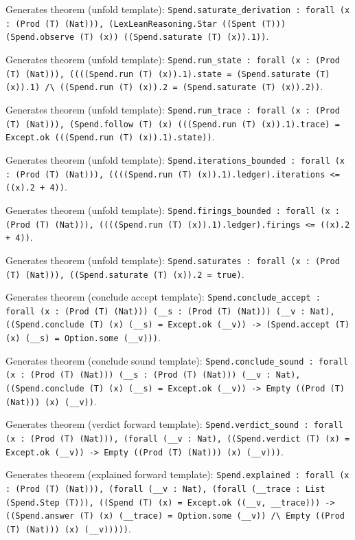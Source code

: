 \documentclass[11pt]{article}
\begin{document}
\noindent Generates theorem (unfold template): \texttt{Spend.saturate\_derivation : forall (x : (Prod (T) (Nat))), (LexLeanReasoning.Star ((Spent (T))) (Spend.observe (T) (x)) ((Spend.saturate (T) (x)).1))}.\par
\noindent Generates theorem (unfold template): \texttt{Spend.run\_state : forall (x : (Prod (T) (Nat))), ((((Spend.run (T) (x)).1).state = (Spend.saturate (T) (x)).1) /\textbackslash{} ((Spend.run (T) (x)).2 = (Spend.saturate (T) (x)).2))}.\par
\noindent Generates theorem (unfold template): \texttt{Spend.run\_trace : forall (x : (Prod (T) (Nat))), (Spend.follow (T) (x) (((Spend.run (T) (x)).1).trace) = Except.ok (((Spend.run (T) (x)).1).state))}.\par
\noindent Generates theorem (unfold template): \texttt{Spend.iterations\_bounded : forall (x : (Prod (T) (Nat))), ((((Spend.run (T) (x)).1).ledger).iterations <= ((x).2 + 4))}.\par
\noindent Generates theorem (unfold template): \texttt{Spend.firings\_bounded : forall (x : (Prod (T) (Nat))), ((((Spend.run (T) (x)).1).ledger).firings <= ((x).2 + 4))}.\par
\noindent Generates theorem (unfold template): \texttt{Spend.saturates : forall (x : (Prod (T) (Nat))), ((Spend.saturate (T) (x)).2 = true)}.\par
\noindent Generates theorem (conclude accept template): \texttt{Spend.conclude\_accept : forall (x : (Prod (T) (Nat))) (\_\_s : (Prod (T) (Nat))) (\_\_v : Nat), ((Spend.conclude (T) (x) (\_\_s) = Except.ok (\_\_v)) -> (Spend.accept (T) (x) (\_\_s) = Option.some (\_\_v)))}.\par
\noindent Generates theorem (conclude sound template): \texttt{Spend.conclude\_sound : forall (x : (Prod (T) (Nat))) (\_\_s : (Prod (T) (Nat))) (\_\_v : Nat), ((Spend.conclude (T) (x) (\_\_s) = Except.ok (\_\_v)) -> Empty ((Prod (T) (Nat))) (x) (\_\_v))}.\par
\noindent Generates theorem (verdict forward template): \texttt{Spend.verdict\_sound : forall (x : (Prod (T) (Nat))), (forall (\_\_v : Nat), ((Spend.verdict (T) (x) = Except.ok (\_\_v)) -> Empty ((Prod (T) (Nat))) (x) (\_\_v)))}.\par
\noindent Generates theorem (explained forward template): \texttt{Spend.explained : forall (x : (Prod (T) (Nat))), (forall (\_\_v : Nat), (forall (\_\_trace : List (Spend.Step (T))), ((Spend (T) (x) = Except.ok ((\_\_v, \_\_trace))) -> ((Spend.answer (T) (x) (\_\_trace) = Option.some (\_\_v)) /\textbackslash{} Empty ((Prod (T) (Nat))) (x) (\_\_v)))))}.\par
\end{document}

